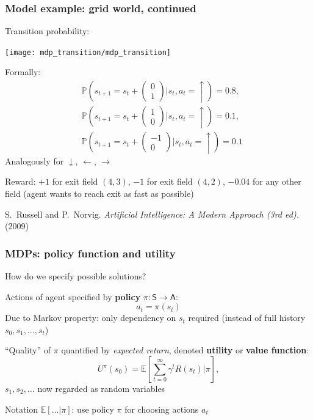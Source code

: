 \documentclass[t]{beamer}
\begin{document}
\begin{frame}
\frametitle{Model example: grid world, continued}
Transition probability:
\begin{center}
\texttt{[image: mdp\_transition/mdp\_transition]}
\end{center}
Formally:
\begin{align*}
&\mathbb{P}\left( s_{t+1} = s_t + \left(\begin{smallmatrix} 0\\1\end{smallmatrix}\right) \vert s_t, a_t = \uparrow \right) = 0.8, \\
&\mathbb{P}\left( s_{t+1} = s_t + \left(\begin{smallmatrix} 1\\0\end{smallmatrix}\right) \vert s_t, a_t = \uparrow \right) = 0.1, \\
&\mathbb{P}\left( s_{t+1} = s_t + \left(\begin{smallmatrix}-1\\0\end{smallmatrix}\right) \vert s_t, a_t = \uparrow \right) = 0.1
\end{align*}
Analogously for $\downarrow$, $\leftarrow$, $\rightarrow$

Reward: $+1$ for exit field $(4,3)$, $-1$ for exit field $(4,2)$, $-0.04$ for any other field (agent wants to reach exit as fast as possible)

\vfill

{\small
S.~Russell and P.~Norvig. \emph{Artificial Intelligence: A Modern Approach (3rd ed).} (2009) \nocite{RussellNorvig}
}
\end{frame}



\begin{frame}
\frametitle{MDPs: policy function and utility}
How do we specify possible solutions?

Actions of agent specified by \textbf{policy} $\pi: \mathsf{S} \to \mathsf{A}$:
\[
a_t = \pi( s_t )
\]
Due to Markov property: only dependency on $s_t$ required (instead of full history $s_0, s_1, \dots, s_t$)

\pause

``Quality'' of $\pi$ quantified by \emph{expected return}, denoted \textbf{utility} or \textbf{value function}:
\[
U^\pi(s_0) = \mathbb{E}\!\left[ \sum_{t=0}^\infty \gamma^t R(s_t) \Big\vert \pi \right],
\]
$s_1, s_2, \dots$ now regarded as random variables

Notation $\mathbb{E}[\dots \vert \pi]$: use policy $\pi$ for choosing actions $a_t$
\end{frame}
\end{document}
